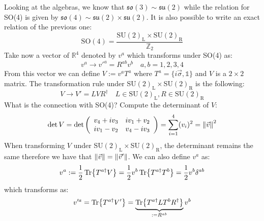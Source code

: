 \documentclass[../main.tex]{subfiles}
\begin{document}
\begin{kaobox}[frametitle=Remarks on SO(4) Algebra]
Looking at the algebras, we know that $\mathfrak{so}(3)\sim\mathfrak{su}(2)$ while the relation for SO(4) is given by $\mathfrak{so}(4)\sim\mathfrak{su}(2)\times\mathfrak{su}(2)$.
It is also possible to write an exact relation of the previous one:
\[
\text{SO}(4)=\frac{\text{SU}(2)_{\text{L}}\times\text{SU}(2)_{\text{R}}}{\mathbb{Z}_2}
\]
Take now a vector of $\mathbb{R}^4$ denoted by $v^a$ which transforms under SO(4) as:
\[
v^a\to v'^a=R^{ab}v^b \quad a,b=1,2,3,4
\]
From this vector we can define $V:=v^aT^a$ where $T^a=\{i\Vec{\sigma},\mathbb{1}\}$ and $V$ is a $2\times2$ matrix. The transformation rule under SU$(2)_{\text{L}}\times$SU$(2)_{\text{R}}$ is the following:
\[
V\to V'=LVR^\dagger \quad L\in\text{SU}(2)_{\text{L}}, R\in\text{SU}(2)_{\text{R}}
\]
What is the connection with SO(4)? Compute the determinant of $V$:
\[
\det V=\det\left(\begin{array}{cc}
    v_4+iv_3 & iv_1+v_2 \\
    iv_1-v_2 & v_4-iv_3
\end{array}\right)=\sum_{i=1}^4(v_i)^2=\norm{\Vec{v}}^2
\]
When transforming $V$ under SU$(2)_{\text{L}}\times$SU$(2)_{\text{R}}$, the determinant remains the same therefore we have that $\norm{\Vec{v}}=\norm{\Vec{v}'}$. We can also define $v^a$ as:
\[
v^a:=\frac{1}{2}\Tr{T^{a\dagger}V}=\frac{1}{2}v^b\Tr{T^{a\dagger}T^b}=\frac{1}{2}v^b\delta^{ab}
\]
which transforms as:
\[
v'^a=\Tr{T^{a\dagger}V'}=\underbrace{\Tr{T^{a\dagger}LT^bR^\dagger}}_{:=R^{ab}}v^b
\]
\end{kaobox}
\end{document}
